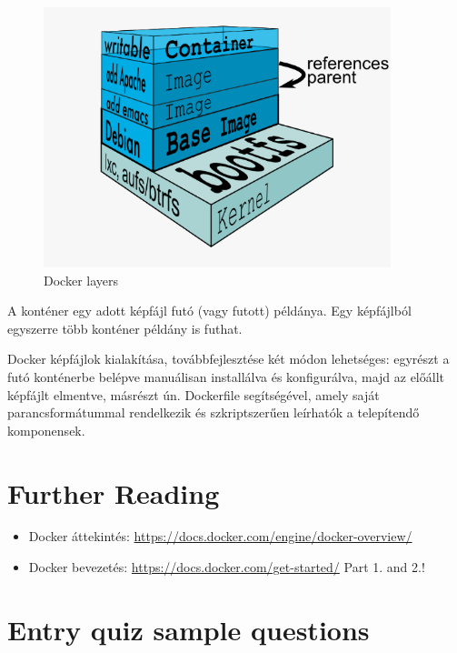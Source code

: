 \documentclass[a4paper]{article}
\begin{document}
\begin{figure}[H]
    \centering
    \includegraphics[width=0.9\textwidth]{figures/docker_layers.png}
    \caption{Docker layers}
    \label{fig:layers}
\end{figure}

A konténer egy adott képfájl futó (vagy futott) példánya. Egy képfájlból egyszerre több konténer példány is futhat.

Docker képfájlok kialakítása, továbbfejlesztése két módon lehetséges: egyrészt a futó konténerbe belépve manuálisan installálva és konfigurálva, majd az előállt képfájlt elmentve, másrészt ún. Dockerfile segítségével, amely saját parancsformátummal rendelkezik és szkriptszerűen leírhatók a telepítendő komponensek.

\section{Further Reading}



\begin{itemize}
    \item Docker áttekintés: \url{https://docs.docker.com/engine/docker-overview/}
    \item Docker bevezetés: \url{https://docs.docker.com/get-started/} Part 1. and 2.!
\end{itemize}


\appendix

\section{Entry quiz sample questions}
\end{document}
